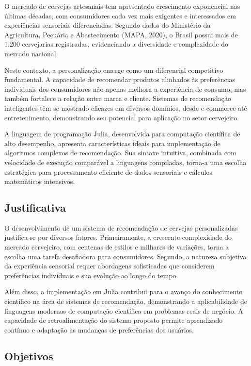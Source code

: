 \documentclass[12pt,a4paper]{article}
\begin{document}
O mercado de cervejas artesanais tem apresentado crescimento exponencial nas últimas décadas, com consumidores cada vez mais exigentes e interessados em experiências sensoriais diferenciadas. Segundo dados do Ministério da Agricultura, Pecuária e Abastecimento (MAPA, 2020), o Brasil possui mais de 1.200 cervejarias registradas, evidenciando a diversidade e complexidade do mercado nacional.

Neste contexto, a personalização emerge como um diferencial competitivo fundamental. A capacidade de recomendar produtos alinhados às preferências individuais dos consumidores não apenas melhora a experiência de consumo, mas também fortalece a relação entre marca e cliente. Sistemas de recomendação inteligentes têm se mostrado eficazes em diversos domínios, desde e-commerce até entretenimento, demonstrando seu potencial para aplicação no setor cervejeiro.

A linguagem de programação Julia, desenvolvida para computação científica de alto desempenho, apresenta características ideais para implementação de algoritmos complexos de recomendação. Sua sintaxe intuitiva, combinada com velocidade de execução comparável a linguagens compiladas, torna-a uma escolha estratégica para processamento eficiente de dados sensoriais e cálculos matemáticos intensivos.

\subsection{Justificativa}

O desenvolvimento de um sistema de recomendação de cervejas personalizadas justifica-se por diversos fatores. Primeiramente, a crescente complexidade do mercado cervejeiro, com centenas de estilos e milhares de variações, torna a escolha uma tarefa desafiadora para consumidores. Segundo, a natureza subjetiva da experiência sensorial requer abordagens sofisticadas que considerem preferências individuais e sua evolução ao longo do tempo.

Além disso, a implementação em Julia contribui para o avanço do conhecimento científico na área de sistemas de recomendação, demonstrando a aplicabilidade de linguagens modernas de computação científica em problemas reais de negócio. A capacidade de retroalimentação do sistema proposto permite aprendizado contínuo e adaptação às mudanças de preferências dos usuários.

\subsection{Objetivos}
\end{document}
